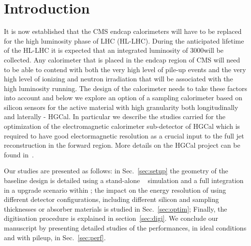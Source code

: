 %
%
%
\clearpage
\section{Introduction}
\label{sec:intro}

It is now established that the CMS endcap calorimeters will have to be replaced for the high
luminosity phase of LHC (HL-LHC). During the anticipated lifetime of
the HL-LHC it is expected
that an integrated luminosity of 3000\fbinv will be collected.
Any calorimeter that is placed in the endcap region of CMS will need to be able to contend with both the very high level of pile-up
events and the very high level of ionizing and neutron irradiation that will be associated with the
high luminosity running. The design of the calorimeter needs to take these factors into account
and below we explore an option of a sampling calorimeter based on silicon sensors for the active
material with high granularity both longitudinally and laterally - HGCal.
In particular we describe the studies carried for the optimization of
the electromagnetic calorimeter sub-detector of HGCal which is
required to have good electormagnetic resolution as a crucial input to
the full jet reconstruction in the forward region.
More details on the HGCal project can be found in~\cite{HGCal}.

Our studies are presented as follows:
in Sec.~\ref{sec:setup} the geometry of the baseline design is
detailed using a stand-alone ~\cite{1610988,Agostinelli:2002hh}
simulation and a full integration in a upgrade scenario within \CMSSW;
the impact on the energy resolution of using different detector
configurations,
including different silicon and sampling thicknesses or absorber
materials is studied in Sec.~\ref{sec:optim};
Finally, the digitisation procedure is explained in
section~\ref{sec:digi}. 
We conclude our manuscript by presenting detailed
studies of the performances, in ideal conditions and with pileup, in Sec.~\ref{sec:perf}.
